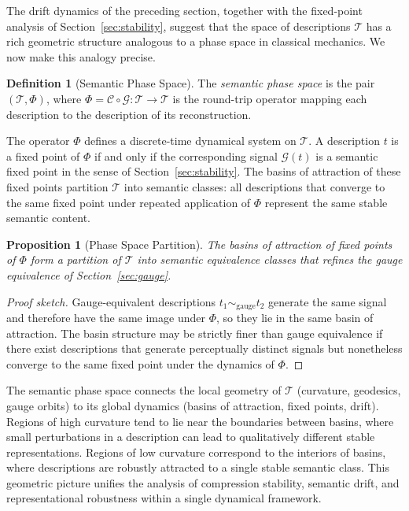 \documentclass[11pt,a4paper]{article}
\newtheorem{proposition}[theorem]{Proposition}
\theoremstyle{definition}
\newtheorem{definition}[theorem]{Definition}
\theoremstyle{remark}
\begin{document}
The drift dynamics of the preceding section, together with the fixed-point analysis of Section~\ref{sec:stability}, suggest that the space of descriptions $\mathcal{T}$ has a rich geometric structure analogous to a phase space in classical mechanics. We now make this analogy precise.

\begin{definition}[Semantic Phase Space]
The \emph{semantic phase space} is the pair $(\mathcal{T}, \Phi)$, where $\Phi = \mathcal{C} \circ \mathcal{G} : \mathcal{T} \rightarrow \mathcal{T}$ is the round-trip operator mapping each description to the description of its reconstruction.
\end{definition}

The operator $\Phi$ defines a discrete-time dynamical system on $\mathcal{T}$. A description $t$ is a fixed point of $\Phi$ if and only if the corresponding signal $\mathcal{G}(t)$ is a semantic fixed point in the sense of Section~\ref{sec:stability}. The basins of attraction of these fixed points partition $\mathcal{T}$ into semantic classes: all descriptions that converge to the same fixed point under repeated application of $\Phi$ represent the same stable semantic content.

\begin{proposition}[Phase Space Partition]
The basins of attraction of fixed points of $\Phi$ form a partition of $\mathcal{T}$ into semantic equivalence classes that refines the gauge equivalence of Section~\ref{sec:gauge}.
\end{proposition}

\begin{proof}[Proof sketch]
Gauge-equivalent descriptions $t_1 \sim_{\mathrm{gauge}} t_2$ generate the same signal and therefore have the same image under $\Phi$, so they lie in the same basin of attraction. The basin structure may be strictly finer than gauge equivalence if there exist descriptions that generate perceptually distinct signals but nonetheless converge to the same fixed point under the dynamics of $\Phi$.
\end{proof}

The semantic phase space connects the local geometry of $\mathcal{T}$ (curvature, geodesics, gauge orbits) to its global dynamics (basins of attraction, fixed points, drift). Regions of high curvature tend to lie near the boundaries between basins, where small perturbations in a description can lead to qualitatively different stable representations. Regions of low curvature correspond to the interiors of basins, where descriptions are robustly attracted to a single stable semantic class. This geometric picture unifies the analysis of compression stability, semantic drift, and representational robustness within a single dynamical framework.
\end{document}
